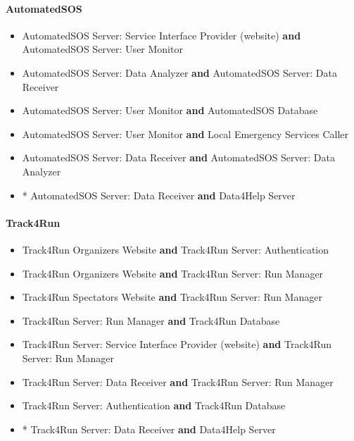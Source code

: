 \documentclass[../DD.tex]{subfiles}
\begin{document}
\paragraph{AutomatedSOS}
\begin{itemize}
	\item{AutomatedSOS Server: Service Interface Provider (website) \textbf{and} AutomatedSOS Server: User Monitor}
	\item{AutomatedSOS Server: Data Analyzer \textbf{and} AutomatedSOS Server: Data Receiver}
	\item{AutomatedSOS Server: User Monitor \textbf{and} AutomatedSOS Database}
	\item{AutomatedSOS Server: User Monitor \textbf{and} Local Emergency Services Caller}
	\item{AutomatedSOS Server: Data Receiver \textbf{and} AutomatedSOS Server: Data Analyzer}
	\item{* AutomatedSOS Server: Data Receiver \textbf{and} Data4Help Server}
\end{itemize}

\paragraph{Track4Run}
\begin{itemize}
	\item{Track4Run Organizers Website \textbf{and} Track4Run Server: Authentication}
	\item{Track4Run Organizers Website \textbf{and} Track4Run Server: Run Manager}
	\item{Track4Run Spectators Website \textbf{and} Track4Run Server: Run Manager}
	\item{Track4Run Server: Run Manager \textbf{and} Track4Run Database}
	\item{Track4Run Server: Service Interface Provider (website) \textbf{and} Track4Run Server: Run Manager}
	\item{Track4Run Server: Data Receiver \textbf{and} Track4Run Server: Run Manager}
	\item{Track4Run Server: Authentication \textbf{and} Track4Run Database}
	\item{* Track4Run Server: Data Receiver \textbf{and} Data4Help Server}
\end{itemize}
\newpage
\end{document}
